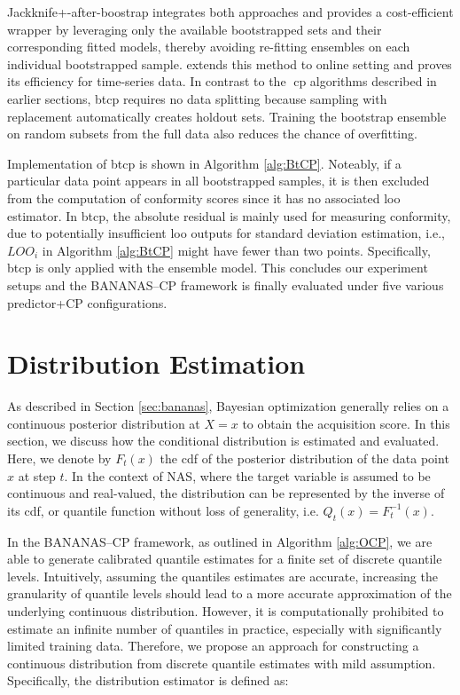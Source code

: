 Jackknife+-after-boostrap \cite{kim2020predictive} integrates both approaches and provides a cost-efficient wrapper by leveraging only the available bootstrapped sets and their corresponding fitted models, thereby avoiding re-fitting ensembles on each individual bootstrapped sample. \cite{pmlr-v139-xu21h} extends this method to online setting and proves its efficiency for time-series data. In contrast to the \gls{cp} algorithms described in earlier sections, \gls{btcp} requires no data splitting because sampling with replacement automatically creates holdout sets. Training the bootstrap ensemble on random subsets from the full data also reduces the chance of overfitting.

Implementation of \gls{btcp} is shown in Algorithm \ref{alg:BtCP}. Noteably, if a particular  data point appears in all bootstrapped samples, it is then excluded from the computation of conformity scores since it has no associated \gls{loo} estimator. In \gls{btcp}, the absolute residual is mainly used for measuring conformity, due to potentially insufficient \gls{loo} outputs for standard deviation estimation, i.e., $LOO_i$ in Algorithm \ref{alg:BtCP} might have fewer than two points. Specifically, \gls{btcp} is only applied with the ensemble model. This concludes our experiment setups and the BANANAS--CP framework is finally evaluated under five various predictor+CP configurations.


\section{Distribution Estimation}
\label{sec:distest}
As described in Section \ref{sec:bananas}, Bayesian optimization generally relies on a continuous posterior distribution at $X=x$ to obtain the acquisition score. In this section, we discuss how the conditional distribution is estimated and evaluated. Here, we denote by $F_t(x)$ the \gls{cdf} of the posterior distribution of the data point $x$ at step $t$. In the context of NAS, where the target variable is assumed to be continuous and real-valued, the distribution can be represented by the inverse of its \gls{cdf}, or quantile function without loss of generality, i.e. $Q_{t}(x) = F^{-1}_{t}(x)$. 

\vspace{0.3em}
In the BANANAS--CP framework, as outlined in Algorithm \ref{alg:OCP}, we are able to generate calibrated quantile estimates for a finite set of discrete quantile levels. Intuitively, assuming the quantiles estimates are accurate, increasing the granularity of quantile levels should lead to a more accurate approximation of the underlying continuous distribution. However, it is computationally prohibited to estimate an infinite number of quantiles in practice, especially with significantly limited training data. Therefore, we propose an approach for constructing a continuous distribution from discrete quantile estimates with mild assumption. Specifically, the distribution estimator is defined as:

